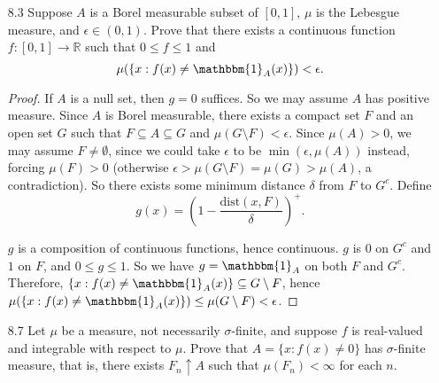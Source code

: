 \documentclass[10pt]{article}
\newcommand{\R}{\mathbb{R}}
\newcommand{\Int}{{\displaystyle \int}}
\begin{document}
\begin{enumerate}
\begin{proof}
Next, suppose that $\sup_n \Int |f_n| d\mu < \infty$ and $\{f_n\}$ is uniformly absolutely continuous.  There exists some $\delta$ such that $$
\left| \Int_A f_n d\mu \right| < \frac{\epsilon}{2}
$$
for each $n$ if $\mu(A) < \delta$.  Thus, if $\mu(A) < \delta$ we have
$$
\Int_A |f_n| = \Int_{A \cap \{x : f_n(x) \geq 0 \}} f_n - \Int_{A \cap \{x : f_n(x) < 0 \}} f_n < \frac{\epsilon}{2} + \frac{\epsilon}{2} = \epsilon.
$$
Suppose we were to have, for all $M$, that $\mu(\{x : |f_n(x)| > M \}) \geq \delta$.  Then, for all $M$, we would have
$$
M\delta \leq M \mu(\{x : |f_n(x)| > M\}) \leq \Int_{\{x : |f_n(x)| > M\}} M \leq \Int_{\{x : |f_n(x)| > M\}} |f_n|
\leq \Int |f_n| \leq \sup \Int |f_n|
$$
contradicting that the supremum is finite.  Thus $\mu(\{x : |f_n(x)| > M \}) \leq \delta$ for some $M$.  Therefore, $\Int_{\{x : |f_n(x)| > M\}} |f_n(x)| d\mu < \epsilon$, so $\{f_n\}$ is uniformly integrable.
\end{proof}

\item[8.3] Suppose $A$ is a Borel measurable subset of $[0,1]$, $\mu$ is the Lebesgue measure, and $\epsilon \in (0,1)$.  Prove that there exists a continuous function $f: [0,1] \rightarrow \R$ such that $0 \leq f \leq 1$ and
$$
\mu(\{x : f(x) \neq \mathbbm{1}_A(x)\}) < \epsilon.
$$

\begin{proof}
If $A$ is a null set, then $g = 0$ suffices.  So we may assume $A$ has positive measure.  Since $A$ is Borel measurable, there exists a compact set $F$ and an open set $G$ such that $F \subseteq A \subseteq G$ and $\mu(G \setminus F) < \epsilon$.  Since $\mu(A) > 0$, we may assume $F \neq \emptyset$, since we could take $\epsilon$ to be $\min(\epsilon, \mu(A))$ instead, forcing $\mu(F) > 0$ (otherwise $\epsilon > \mu(G\setminus F) = \mu(G) > \mu(A)$, a contradiction).  So there exists some minimum distance $\delta$ from $F$ to $G^c$.  Define
$$
g(x) = \left(1 - \frac{\text{dist}(x,F)}{\delta}\right)^+.
$$

$g$ is a composition of continuous functions, hence continuous.  $g$ is 0 on $G^c$ and $1$ on $F$, and $0 \leq g \leq 1$.  So we have $g = \mathbbm{1}_A$ on both $F$ and $G^c$.  Therefore, $\{x : f(x) \neq \mathbbm{1}_A(x)\} \subseteq G \setminus F$, hence $\mu(\{x : f(x) \neq \mathbbm{1}_A(x)\}) \leq \mu(G \setminus F) < \epsilon$.
\end{proof}

\item[8.7] Let $\mu$ be a measure, not necessarily $\sigma$-finite, and suppose $f$ is real-valued and integrable with respect to $\mu$.  Prove that $A = \{x : f(x) \neq 0\}$ has $\sigma$-finite measure, that is, there exists $F_n \uparrow A$ such that $\mu(F_n) < \infty$ for each $n$.


\end{enumerate}
\end{document}
